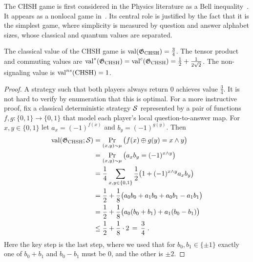 The CHSH game is first considered in the Physics literature as a Bell inequality~\cite{clauser1969proposed}. It appears as a nonlocal game in~\cite{cleve2004consequences}. Its central role is justified by the fact that it is the simplest game, where simplicity is measured by question and answer alphabet sizes, whose classical and quantum values are separated. 

\begin{lemma}\label{lemma-chsh-qval}
The classical value of the CHSH game is $\mathrm{val}(\mathfrak{G}_{\mathrm{CHSH}})=\frac{3}{4}$. The tensor product and commuting values are $\mathrm{val}^*(\mathfrak{G}_{\mathrm{CHSH}})=\mathrm{val}^c(\mathfrak{G}_{\mathrm{CHSH}})= \frac{1}{2} + \frac{1}{2\sqrt{2}}$. The non-signaling value is $\mathrm{val}^{ns}(\mathrm{CHSH})=1$. 
\end{lemma}

\begin{proof}
A strategy such that both players always return $0$ achieves value $\frac{3}{4}$. It is not hard to verify by enumeration that this is optimal. For a more instructive proof, fix a classical deterministic strategy $\mathcal{S}$ represented by a pair of functions $f,g:\{0,1\}\to\{0,1\}$ that model each player's local question-to-answer map. For $x,y\in\{0,1\}$ let $a_x = (-1)^{f(x)}$ and $b_y = (-1)^{g(y)}$. Then 
\begin{align}
\mathrm{val}(\mathfrak{G}_{\mathrm{CHSH}};\mathcal{S}) &= \Pr_{(x,y)\sim \mu} \big( f(x)\oplus g(y) = x\wedge y \big) \label{equation-chsh-qval1}\\
 &= \Pr_{(x,y)\sim \mu} \big( a_x b_y = (-1)^{x\wedge y} \big) \notag\\
&= \frac{1}{4}\sum_{x,y\in\{0,1\}}\frac{1}{2}\big(1 + (-1)^{x\wedge y} a_x b_y\big)\notag\\
&= \frac{1}{2} + \frac{1}{8}\big( a_0 b_0 + a_1 b_0 + a_0 b_1 - a_1 b_1 \big)\notag\\
 &= \frac{1}{2} + \frac{1}{8}\big( a_0 (b_0 + b_1) + a_1 (b_0 -  b_1) \big)\notag\\
&\leq \frac{1}{2} + \frac{1}{8} \cdot 2\,=\, \frac{3}{4}\;.\notag
\end{align}
Here the key step is the last step, where we used that for $b_0,b_1 \in \{\pm 1\}$ exactly one of $b_0+b_1$ and $b_0-b_1$ must be $0$, and the other is $\pm 2$. 


\end{proof}

